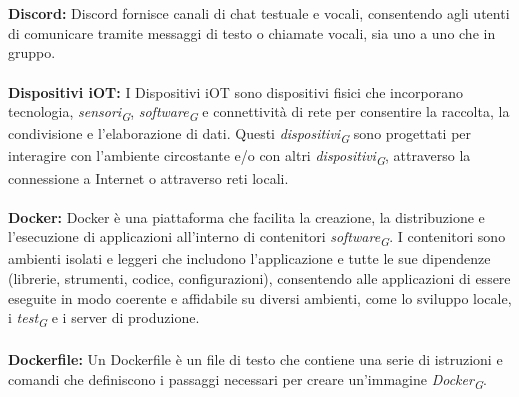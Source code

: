 \documentclass{article}
\begin{document}
\\
\\
\textbf{Discord:} Discord fornisce canali di chat testuale e vocali, consentendo agli utenti di comunicare tramite messaggi di testo o chiamate vocali, sia uno a uno che in gruppo.
\\
\\
\textbf{Dispositivi iOT:} I Dispositivi iOT sono dispositivi fisici che incorporano tecnologia, \textit{sensori}\textsubscript{\textit{G}}, \textit{software}\textsubscript{\textit{G}} e connettività di rete per consentire la raccolta, la condivisione e l'elaborazione di dati. Questi \textit{dispositivi}\textsubscript{\textit{G}} sono progettati per interagire con l'ambiente circostante e/o con altri \textit{dispositivi}\textsubscript{\textit{G}}, attraverso la connessione a Internet o attraverso reti locali.
\\
\\
\textbf{Docker:} Docker è una piattaforma che facilita la creazione, la distribuzione e l'esecuzione di applicazioni all'interno di contenitori \textit{software}\textsubscript{\textit{G}}. I contenitori sono ambienti isolati e leggeri che includono l'applicazione e tutte le sue dipendenze (librerie, strumenti, codice, configurazioni), consentendo alle applicazioni di essere eseguite in modo coerente e affidabile su diversi ambienti, come lo sviluppo locale, i \textit{test}\textsubscript{\textit{G}} e i server di produzione.
\\
\\
\textbf{Dockerfile:} Un Dockerfile è un file di testo che contiene una serie di istruzioni e comandi che definiscono i passaggi necessari per creare un'immagine \textit{Docker}\textsubscript{\textit{G}}.
\\
\\
\pagebreak
\end{document}
